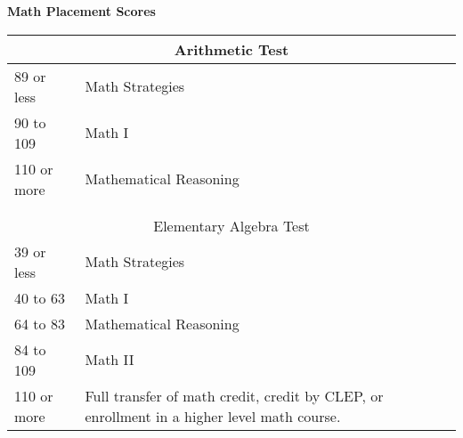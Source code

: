 \documentclass[12pt,dvipsnames]{article}
\begin{document}
\thispagestyle{empty}
\vskip 2cm

\centering 
{\Large \bfseries Math Placement Scores}
\vskip 2cm

		\begin{tabular}{p{3cm} p{5cm}}
			\hline
			\multicolumn{2}{c}{\sc Arithmetic Test}\\\hline
			89 or less & Math Strategies\\ 
			
			90 to 109 & Math I\\ 
			
			110 or more  & Mathematical Reasoning\\ 
		

			&\\&\\
			\hline
			\multicolumn{2}{c}{\sc Elementary Algebra Test}\\\hline
		39 or less & Math Strategies\\ 
	
		40 to 63 & Math I\\ 
		
		64 to 83 & Mathematical Reasoning\\ 
		
		84 to 109 & Math II\\ 
		
		110 or more & Full transfer of math credit, credit by CLEP, or enrollment in a higher level math course.\\ 
		 
		\end{tabular}




 
\end{document}
